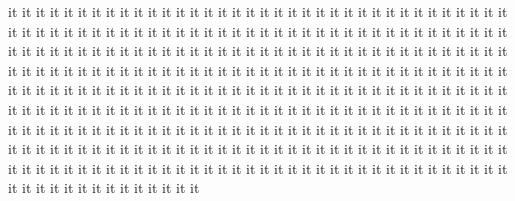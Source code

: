 \documentclass{report}
\begin{document}
  it it it it it it it it it it it it it it it it it it it it it it it it it it 
  it it it it it it it it it it it it it it it it it it it it it it it it it it 
  it it it it it it it it it it it it it it it it it it it it it it it it it it 
  it it it it it it it it it it it it it it it it it it it it it it it it it it 
  it it it it it it it it it it it it it it it it it it it it it it it it it it 
  it it it it it it it it it it it it it it it it it it it it it it it it it it 
  it it it it it it it it it it it it it it it it it it it it it it it it it it 
  it it it it it it it it it it it it it it it it it it it it it it it it it it 
  it it it it it it it it it it it it it it it it it it it it it it it it it it 
  it it it it it it it it it it it it it it it it it it it it it it it it it it 
  it it it it it it it it it it it it it it it it it it it it it it it it it it 
  it it it it it it it it it it it it it it it it it it it it it it it it it it 
  it it it it it it it it it it it it it it it it it it it it it it it it it it 
  
\vfil\null
\end{document}
